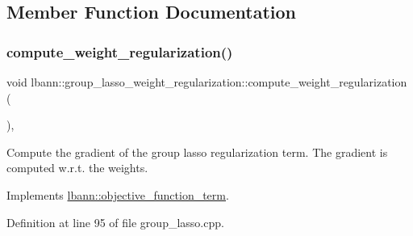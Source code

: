\subsection{Member Function Documentation}
\mbox{\label{classlbann_1_1group__lasso__weight__regularization_a9d721928716349c8327ca67257fb827a}} 
\subsubsection{\texorpdfstring{compute\+\_\+weight\+\_\+regularization()}{compute\_weight\_regularization()}}
{\footnotesize\ttfamily void lbann\+::group\+\_\+lasso\+\_\+weight\+\_\+regularization\+::compute\+\_\+weight\+\_\+regularization (\begin{DoxyParamCaption}{ }\end{DoxyParamCaption})\hspace{0.3cm}{\ttfamily [override]}, {\ttfamily [virtual]}}

Compute the gradient of the group lasso regularization term. The gradient is computed w.\+r.\+t. the weights. 

Implements \hyperlink{classlbann_1_1objective__function__term_a134cf89caed45527bbe9d811a0b93dfc}{lbann\+::objective\+\_\+function\+\_\+term}.



Definition at line 95 of file group\+\_\+lasso.\+cpp.


